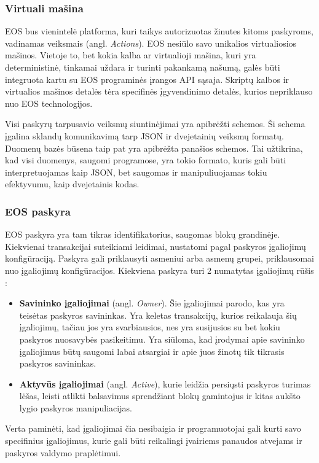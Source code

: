 \documentclass{VUMIFPSkursinis}
\begin{document}
\subsubsection{Virtuali mašina}
EOS bus vienintelė platforma, kuri taikys autorizuotas žinutes kitoms paskyroms, vadinamas veiksmais (angl. \textit{Actions}). EOS nesiūlo savo unikalios virtualiosios mašinos. Vietoje to, bet kokia kalba ar virtualioji mašina, kuri yra deterministinė, tinkamai uždara ir turinti pakankamą našumą, galės būti integruota kartu su EOS programinės įrangos API sąsaja. Skriptų kalbos ir virtualios mašinos detalės tėra specifinės įgyvendinimo detalės, kurios nepriklauso nuo EOS technologijos. 

Visi paskyrų tarpusavio veiksmų siuntinėjimai yra apibrėžti schemos. Ši schema įgalina sklandų komunikavimą tarp JSON ir dvejetainių veiksmų formatų. Duomenų bazės būsena taip pat yra apibrėžta panašios schemos. Tai užtikrina, kad visi duomenys, saugomi programose, yra tokio formato, kuris gali būti interpretuojamas kaip JSON, bet saugomas ir manipuliuojamas tokiu efektyvumu, kaip dvejetainis kodas.

\subsubsection{EOS paskyra}
EOS paskyra yra tam tikras identifikatorius, saugomas blokų grandinėje. Kiekvienai transakcijai suteikiami leidimai, nustatomi pagal paskyros įgaliojimų konfigūraciją. Paskyra gali priklausyti asmeniui arba asmenų grupei, priklausomai nuo įgaliojimų konfigūracijos. Kiekviena paskyra turi 2 numatytas įgaliojimų rūšis \cite{Cox2018next}:
\begin{itemize}
    \item \textbf{Savininko įgaliojimai} (angl. \textit{Owner}). Šie įgaliojimai parodo, kas yra teisėtas paskyros savininkas. Yra keletas transakcijų, kurios reikalauja šių įgaliojimų, tačiau jos yra svarbiausios, nes yra susijusios su bet kokiu paskyros nuosavybės pasikeitimu. Yra siūloma, kad įrodymai apie savininko įgaliojimus būtų saugomi labai atsargiai ir apie juos žinotų tik tikrasis paskyros savininkas.
    \item \textbf{Aktyvūs įgaliojimai} (angl. \textit{Active}), kurie leidžia persiųsti paskyros turimas lėšas, leisti atlikti balsavimus sprendžiant blokų gamintojus ir kitas aukšto lygio paskyros manipuliacijas.
\end{itemize}
Verta paminėti, kad įgaliojimai čia nesibaigia ir programuotojai gali kurti savo specifinius įgaliojimus, kurie gali būti reikalingi įvairiems panaudos atvejams ir paskyros valdymo praplėtimui.
\end{document}
